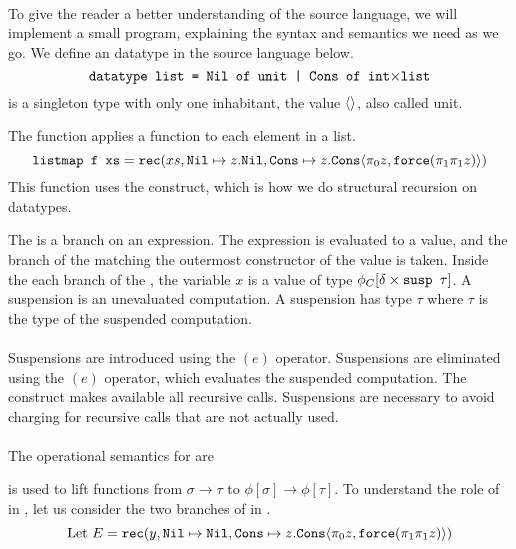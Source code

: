 \paragraph{}
To give the reader a better understanding of the source language, we will
implement a small program, explaining the syntax and semantics we need as we
go.  We define an  datatype in the source language below.
%
\[
  \T{datatype list = Nil of unit | Cons of int$\times$list}
\]
%
 is a singleton type with only one inhabitant, the value
$\LP\RP$, also called unit.


The  function applies a function to each element in a list.
%
\[
  \T{listmap f xs} = \T{rec}(xs, \T{Nil} \mapsto z.\T{Nil}, \T{Cons} \mapsto z.\T{Cons}\LP\pi_0 z, \T{force}(\pi_1\pi_1 z)\RP)
\]
%
This function uses the  construct, which is how we do structural
recursion on datatypes.
%
\begin{prooftree}
\end{prooftree}
%
The  is a branch on an expression. The expression is evaluated to a
value, and the branch of the  matching the outermost constructor of the
value is taken. Inside the each branch of the , the variable $x$ is a
value of type $\phi_C[\delta \times \T{susp } \tau]$. A suspension is an
unevaluated computation.  A suspension has type  $\tau$ where $\tau$ is
the type of the suspended computation.

\paragraph{}
Suspensions are introduced using the $(e)$ operator.  Suspensions are
eliminated using the $(e)$ operator, which evaluates the suspended
computation. The  construct makes available all recursive calls.
Suspensions are necessary to avoid charging for recursive calls that are not
actually used.

\paragraph{}
The operational semantics for  are
%
\begin{prooftree}
\end{prooftree}
%
 is used to lift functions from $\sigma \rightarrow \tau$ to
$\phi[\sigma] \rightarrow \phi[\tau]$. To understand the role of  in
, let us consider the two branches of  in .
%
\[
  \text{Let } E = \T{rec}(y, \T{Nil} \mapsto \T{Nil}, \T{Cons} \mapsto z.\T{Cons}\LP\pi_0 z, \T{force}(\pi_1\pi_1 z)\RP)
\]
%

